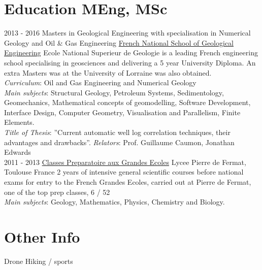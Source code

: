 \documentclass[]{friggeri-cv}
\begin{document}
\section{Education MEng, MSc}
\begin{entrylist}
  \entry
    {2013 - 2016}
    {Masters in Geological Engineering with specialisation in Numerical Geology and Oil \& Gas Engineering}
    {\href{http://ensg.univ-lorraine.fr/english/}{French National School of Geological Engineering}}
    {Ecole National Superieur de Geologie is a leading French engineering school specialising in geosciences and delivering a 5 year University Diploma. An extra Masters was at the University of Lorraine was also obtained.\\ \emph{Curriculum}: Oil and Gas Engineering and Numerical Geology\\ 
    \emph{Main subjects}: Structural Geology, Petroleum Systems, Sedimentology, Geomechanics, Mathematical concepts of geomodelling, Software Development, Interface Design, Computer Geometry, Visualisation and Parallelism, Finite Elements.\\
    \emph{Title of Thesis}: ”Current automatic well log correlation techniques, their advantages and drawbacks”.
    \emph{Relators}: Prof. Guillaume Caumon, Jonathan Edwards\\}
  \entry
    {2011 - 2013}
    {\href{https://en.wikipedia.org/wiki/Classe_preparatoire_aux_grandes_ecoles}{Classes Preparatoire aux Grandes Ecoles}}
    {Lycee Pierre de Fermat, Toulouse France}
    {2 years of intensive general scientific courses before national exams for entry to the French Grandes Ecoles, carried out at Pierre de Fermat, one of the top prep classes, 6 / 52\\ 
    \emph{Main subjects}: Geology, Mathematics, Physics, Chemistry and Biology.\\}
\end{entrylist}

\section{Other Info}
Drone
Hiking / sports
\end{document}
